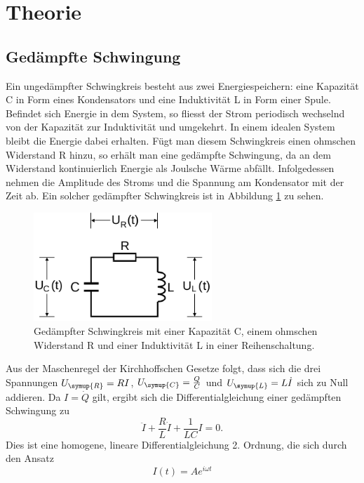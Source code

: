 \section{Theorie}
\label{sec:Theorie}
\subsection{Gedämpfte Schwingung}
Ein ungedämpfter Schwingkreis besteht aus zwei Energiespeichern: eine Kapazität C
in Form eines Kondensators und eine Induktivität L in Form einer Spule. Befindet
sich Energie in dem System, so fliesst der Strom periodisch wechselnd von der
Kapazität zur Induktivität und umgekehrt. In einem idealen System bleibt die Energie
dabei erhalten.
Fügt man diesem Schwingkreis einen ohmschen Widerstand R hinzu, so erhält man eine
gedämpfte Schwingung, da an dem Widerstand kontinuierlich Energie als Joulsche Wärme
abfällt. Infolgedessen nehmen die Amplitude des Stroms und die Spannung am
Kondensator mit der Zeit ab. Ein solcher gedämpfter Schwingkreis ist in Abbildung
\ref{fig:gedaempfter_schwingkreis} zu sehen.
\begin{figure}
  \centering
  \includegraphics[width=0.6\textwidth]{gedaempfter_schwingkreis.png}
  \caption{Gedämpfter Schwingkreis mit einer Kapazität C, einem ohmschen Widerstand R
  und einer Induktivität L in einer Reihenschaltung.\cite{sample}}
  \label{fig:gedaempfter_schwingkreis}
\end{figure}
Aus der Maschenregel der Kirchhoffschen Gesetze folgt, dass sich die drei Spannungen
$U_\symup{R} = R I$, $U_\symup{C} = \frac{Q}{C}$ und $U_\symup{L} = L \dot{I}$
sich zu Null addieren. Da $I=\dot{Q}$ gilt, ergibt sich die Differentialgleichung
einer gedämpften Schwingung zu
\begin{equation}
  \ddot{I} + \frac{R}{L}\dot{I} + \frac{1}{L C} I = 0.
  \label{eqn:dgl1}
\end{equation}
Dies ist eine homogene, lineare Differentialgleichung 2. Ordnung, die sich durch
den Ansatz
\begin{equation}
  I(t) = A e^{i \omega t}
  \label{eqn:ansatz}
\end{equation}
